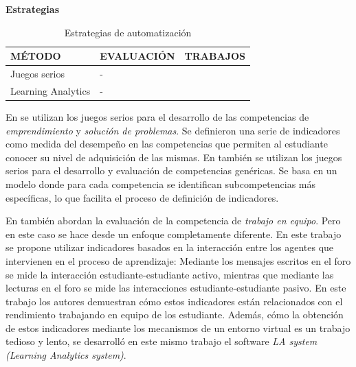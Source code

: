 \bigskip
\textbf{Estrategias}
\bigskip

\begin{table}
  \begin{center}
  \begin{tabular}{| m{3.5cm} | m{3.5cm} | m{5.5cm} |}
    \hline
    MÉTODO & EVALUACIÓN & TRABAJOS\\
    \hline
    \hline
    Juegos serios & - &  \cite{guenaga2013serious,bedek2011behavioral} \\
    \hline
    Learning Analytics & - &  \cite{fidalgo:2015,rayon2014web} \\
    \hline
  \end{tabular}
\end{center}
\caption{Estrategias de automatización}
\label{tab:EstrategiasAutomaticas}
\end{table}

En \cite{guenaga2013serious} se utilizan los juegos serios para el desarrollo de las competencias de \emph{emprendimiento} y \emph{solución de problemas}. Se definieron una serie de indicadores como medida del desempeño en las competencias que permiten al estudiante conocer su nivel de adquisición de las mismas. En \cite{bedek2011behavioral} también se utilizan los juegos serios para el desarrollo y evaluación de competencias genéricas. Se basa en un modelo donde para cada competencia se identifican subcompetencias más específicas, lo que facilita el proceso de definición de indicadores.



En \cite{fidalgo:2015} también abordan la evaluación de la competencia de \emph{trabajo en equipo}. Pero en este caso se hace desde un enfoque completamente diferente. En este trabajo se propone utilizar indicadores basados en la interacción entre los agentes que intervienen en el proceso de aprendizaje: Mediante los mensajes escritos en el foro se mide la interacción estudiante-estudiante activo, mientras que mediante las lecturas en el foro se mide las interacciones estudiante-estudiante pasivo. En este trabajo los autores demuestran cómo estos indicadores están relacionados con el rendimiento trabajando en equipo de los estudiante. Además, cómo la obtención de estos indicadores mediante los mecanismos de un entorno virtual es un trabajo tedioso y lento, se desarrolló en este mismo trabajo el software \emph{LA system (Learning Analytics system)}.

